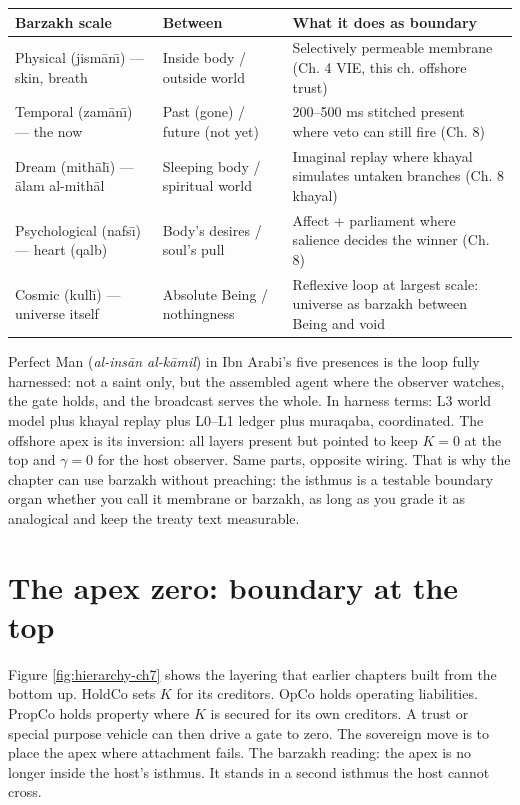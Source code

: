 \begin{center}
\small
\begin{tabular}{p{2.8cm}p{3.4cm}p{5.2cm}}
\toprule
Barzakh scale & Between & What it does as boundary \\
\midrule
Physical (jism\=an\=\i) --- skin, breath & Inside body / outside world & Selectively permeable membrane (Ch. 4 VIE, this ch. offshore trust) \\
Temporal (zam\=an\=\i) --- the now & Past (gone) / future (not yet) & 200--500 ms stitched present where veto can still fire (Ch. 8) \\
Dream (mith\=al\=\i) --- \=alam al-mith\=al & Sleeping body / spiritual world & Imaginal replay where khayal simulates untaken branches (Ch. 8 khayal) \\
Psychological (nafs\=\i) --- heart (qalb) & Body's desires / soul's pull & Affect + parliament where salience decides the winner (Ch. 8) \\
Cosmic (kull\=\i) --- universe itself & Absolute Being / nothingness & Reflexive loop at largest scale: universe as barzakh between Being and void \\
\bottomrule
\end{tabular}
\end{center}

Perfect Man (\textit{al-ins\=an al-k\=amil}) in Ibn Arabi's five presences is the loop fully harnessed: not a saint only, but the assembled agent where the observer watches, the gate holds, and the broadcast serves the whole. In harness terms: L3 world model plus khayal replay plus L0--L1 ledger plus muraqaba, coordinated. The offshore apex is its inversion: all layers present but pointed to keep $K=0$ at the top and $\gamma=0$ for the host observer. Same parts, opposite wiring. That is why the chapter can use barzakh without preaching: the isthmus is a testable boundary organ whether you call it membrane or barzakh, as long as you grade it as analogical and keep the treaty text measurable.

\section{The apex zero: boundary at the top}

Figure \ref{fig:hierarchy-ch7} shows the layering that earlier chapters built from the bottom up. HoldCo sets $K$ for its creditors. OpCo holds operating liabilities. PropCo holds property where $K$ is secured for its own creditors. A trust or special purpose vehicle can then drive a gate to zero. The sovereign move is to place the apex where attachment fails. The barzakh reading: the apex is no longer inside the host's isthmus. It stands in a second isthmus the host cannot cross.

